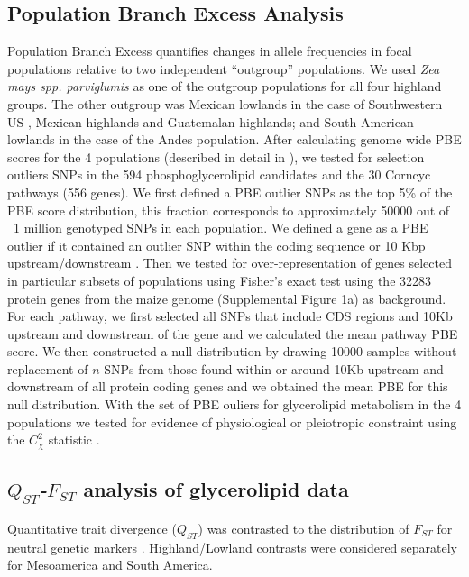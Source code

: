 \documentclass[9pt,twocolumn,twoside,lineno]{BioRxiv}
\begin{document}
\subsection{Population Branch Excess Analysis}
Population Branch Excess quantifies changes in allele frequencies in focal populations relative to two independent “outgroup” populations.
We used \textit{Zea mays spp. parviglumis} as one of the outgroup populations for all four highland groups.  
The other outgroup was  Mexican lowlands  in the case of Southwestern US , Mexican highlands and Guatemalan highlands; and South American lowlands in the case of the Andes population. 
After calculating genome wide PBE scores for the 4 populations (described in detail in \cite{Wang2020-mp}), we tested for selection outliers SNPs in the 594 phosphoglycerolipid candidates and the 30 Corncyc pathways (556 genes).
We first defined a PBE outlier SNPs as the top 5\% of the PBE score distribution, this fraction corresponds to approximately 50000 out of ~1 million genotyped SNPs in each population. 
We defined a gene as a PBE outlier if it contained an outlier SNP within the coding sequence or 10 Kbp upstream/downstream  \cite{Wang2020-mp}. 
Then we tested for over-representation of genes selected in particular subsets of populations using Fisher's exact test using the 32283 protein genes from the maize genome (Supplemental Figure 1a) \cite{wang2015a} as background. 
For each pathway, we first selected all SNPs that include CDS regions and 10Kb upstream and downstream of the gene and we calculated the mean pathway PBE score. 
We then constructed a null distribution by drawing 10000 samples without replacement of $n$ SNPs from those found within or around 10Kb upstream and downstream of all protein coding genes and we obtained the mean PBE for this null distribution. 
With the set of PBE ouliers for glycerolipid metabolism in the 4 populations we tested for evidence of physiological or pleiotropic constraint using the $C_\chi^2$ statistic \cite{yeaman2018}. 

\subsection{\textit{$Q_{ST}$-$F_{ST}$} analysis of glycerolipid data}
Quantitative trait divergence ($Q_{ST}$) was contrasted to the distribution of $F_{ST}$ for neutral genetic markers \cite{whitlock2008evolutionary}.
Highland/Lowland contrasts were considered separately for Mesoamerica and South America.
\end{document}
